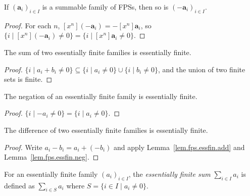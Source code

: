 \begin{lemma}
\label{lem.fps.summable.neg}
\leanhelper
\leanok
If $\left(\mathbf{a}_{i}\right)_{i\in I}$ is a summable family of FPSs,
then so is $\left(-\mathbf{a}_{i}\right)_{i\in I}$.
\end{lemma}

\begin{proof}
\leanok
For each $n$, $\left[x^{n}\right](-\mathbf{a}_{i})=-\left[x^{n}\right]\mathbf{a}_{i}$,
so $\{i \mid \left[x^{n}\right](-\mathbf{a}_{i})\neq 0\} = \{i \mid \left[x^{n}\right]\mathbf{a}_{i}\neq 0\}$.
\end{proof}

\begin{lemma}
\label{lem.fps.essfin.add}
\leanhelper
\leanok
The sum of two essentially finite families is essentially finite.
\end{lemma}

\begin{proof}
\leanok
$\{i \mid a_{i}+b_{i}\neq 0\}\subseteq \{i \mid a_{i}\neq 0\}\cup\{i \mid b_{i}\neq 0\}$,
and the union of two finite sets is finite.
\end{proof}

\begin{lemma}
\label{lem.fps.essfin.neg}
\leanhelper
\leanok
The negation of an essentially finite family is essentially finite.
\end{lemma}

\begin{proof}
\leanok
$\{i \mid -a_{i}\neq 0\}=\{i \mid a_{i}\neq 0\}$.
\end{proof}

\begin{lemma}
\label{lem.fps.essfin.sub}
\leanhelper
\leanok
The difference of two essentially finite families is essentially finite.
\end{lemma}

\begin{proof}
\leanok
Write $a_i - b_i = a_i + (-b_i)$ and apply
Lemma~\ref{lem.fps.essfin.add} and Lemma~\ref{lem.fps.essfin.neg}.
\end{proof}

\begin{definition}
\label{def.fps.essFinSum}
\leanhelper
\leanok
For an essentially finite family $(a_i)_{i\in I}$, the \emph{essentially finite sum}
$\sum_{i\in I} a_i$ is defined as $\sum_{i\in S} a_i$ where $S = \{i\in I \mid a_i \neq 0\}$.
\end{definition}

